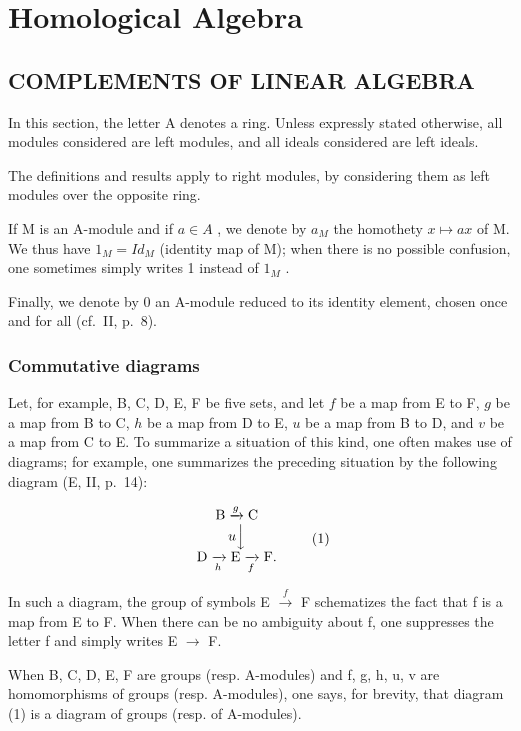 \chapter{Homological Algebra}

\section{COMPLEMENTS OF LINEAR ALGEBRA}

In this section, the letter A denotes a ring. Unless expressly stated otherwise, all modules considered are left modules, and all ideals considered are left ideals.

The definitions and results apply to right modules, by considering them as left modules over the opposite ring.

If M is an A-module and if \(a \in A\) , we denote by \(a_{M}\) the homothety \(x \mapsto ax\) of M. We thus have \(1_{M} = Id_{M}\) (identity map of M); when there is no possible confusion, one sometimes simply writes 1 instead of \(1_{M}\) .

Finally, we denote by 0 an A-module reduced to its identity element, chosen once and for all (cf.~II, p.~8).

\subsection{Commutative diagrams}

Let, for example, B, C, D, E, F be five sets, and let \(f\) be a map from E to F, \(g\) be a map from B to C, \(h\) be a map from D to E, \(u\) be a map from B to D, and \(v\) be a map from C to E. To summarize a situation of this kind, one often makes use of diagrams; for example, one summarizes the preceding situation by the following diagram (E, II, p.~14):

\[
\begin{array}{c} \mathrm{B} \xrightarrow {g} \mathrm{C} \\ u \Big \downarrow \\ \mathrm{D} \xrightarrow [ h ]{} \mathrm{E} \xrightarrow [ f ]{} \mathrm{F}. \end{array}\tag{1}
\]

In such a diagram, the group of symbols E \(\xrightarrow{f}\) F schematizes the fact that f is a map from E to F. When there can be no ambiguity about f, one suppresses the letter f and simply writes E \(\rightarrow\) F.

When B, C, D, E, F are groups (resp. A-modules) and f, g, h, u, v are homomorphisms of groups (resp. A-modules), one says, for brevity, that diagram (1) is a diagram of groups (resp. of A-modules).

